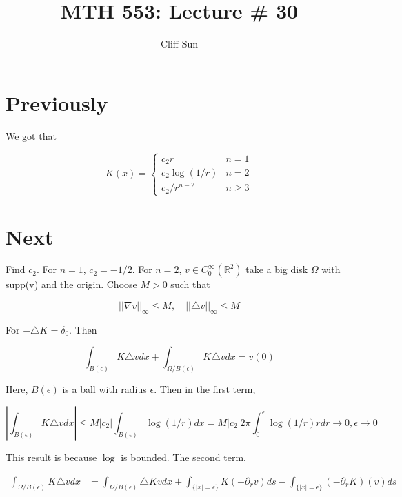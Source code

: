 \documentclass{article}
\title{MTH 553: Lecture \# 30}
\author{Cliff Sun}
\newtheorem{one minute paper}[theorem]{One Minute Paper}
\begin{document}
\maketitle

\section*{Previously}

We got that 

\begin{equation}
    K(x) = \begin{cases}
        c_2r & n=1\\
        c_2\log(1/r) & n=2\\
        c_2/r^{n-2} & n\geq 3
    \end{cases}
\end{equation} 

\section*{Next}

Find $c_2$. For $n=1$, $c_2 = -1/2$. For $n=2$, $v \in C^{\infty}_0(\mathbb{R}^2)$ take a big disk $\Omega$ with supp(v) and the origin. Choose $M > 0$ such that 

\begin{equation}
    ||\nabla v ||_{\infty} \leq M, \quad || \triangle v ||_{\infty} \leq M
\end{equation}

For $-\triangle K = \delta_{0}$. Then 

\begin{equation}
    \int_{B(\epsilon)}K\triangle v dx + \int_{\Omega/B(\epsilon)}K\triangle v dx = v(0)
\end{equation}

Here, $B(\epsilon)$ is a ball with radius $\epsilon$. Then in the first term, 

\begin{equation}
    | \int_{B(\epsilon)}K\triangle v dx | \leq M |c_2| \int_{B(\epsilon)}\log(1/r)dx = M|c_2|2\pi \int_{0}^{\epsilon}\log(1/r)rdr \rightarrow 0, \epsilon\rightarrow 0
\end{equation}

This result is because $\log$ is bounded. The second term, 

\begin{align*}
    \int_{\Omega / B(\epsilon)} K\triangle v dx &= \int_{\Omega / B(\epsilon)} \triangle K v dx + \int_{\{|x| = \epsilon\}}K\left( -\partial_{r}v \right)ds - \int_{\{|x| = \epsilon\}}\left( -\partial_{r}K \right)\left( v \right)ds
\end{align*}
\end{document}
